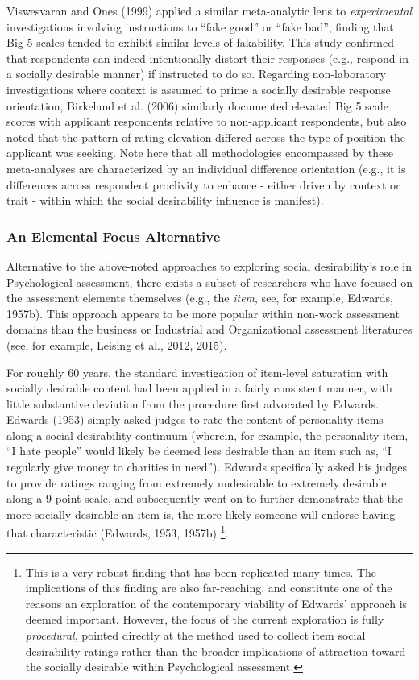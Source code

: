 \documentclass[
  ,jou]{apa6}
\begin{document}
Viswesvaran and Ones (1999) applied a similar meta-analytic lens to \emph{experimental} investigations involving instructions to ``fake good'' or ``fake bad'', finding that Big 5 scales tended to exhibit similar levels of fakability. This study confirmed that respondents can indeed intentionally distort their responses (e.g., respond in a socially desirable manner) if instructed to do so. Regarding non-laboratory investigations where context is assumed to prime a socially desirable response orientation, Birkeland et al. (2006) similarly documented elevated Big 5 scale scores with applicant respondents relative to non-applicant respondents, but also noted that the pattern of rating elevation differed across the type of position the applicant was seeking. Note here that all methodologies encompassed by these meta-analyses are characterized by an individual difference orientation (e.g., it is differences across respondent proclivity to enhance - either driven by context or trait - within which the social desirability influence is manifest).

\hypertarget{an-elemental-focus-alternative}{%
\subsubsection{An Elemental Focus Alternative}\label{an-elemental-focus-alternative}}

Alternative to the above-noted approaches to exploring social desirability's role in Psychological assessment, there exists a subset of researchers who have focused on the assessment elements themselves (e.g., the \emph{item}, see, for example, Edwards, 1957b). This approach appears to be more popular within non-work assessment domains than the business or Industrial and Organizational assessment literatures (see, for example, Leising et al., 2012, 2015).

For roughly 60 years, the standard investigation of item-level saturation with socially desirable content had been applied in a fairly consistent manner, with little substantive deviation from the procedure first advocated by Edwards. Edwards (1953) simply asked judges to rate the content of personality items along a social desirability continuum (wherein, for example, the personality item, ``I hate people'' would likely be deemed less desirable than an item such as, ``I regularly give money to charities in need''). Edwards specifically asked his judges to provide ratings ranging from extremely undesirable to extremely desirable along a 9-point scale, and subsequently went on to further demonstrate that the more socially desirable an item is, the more likely someone will endorse having that characteristic (Edwards, 1953, 1957b) \footnote{This is a very robust finding that has been replicated many times. The implications of this finding are also far-reaching, and constitute one of the reasons an exploration of the contemporary viability of Edwards' approach is deemed important. However, the focus of the current exploration is fully \emph{procedural}, pointed directly at the method used to collect item social desirability ratings rather than the broader implications of attraction toward the socially desirable within Psychological assessment.}.
\end{document}
